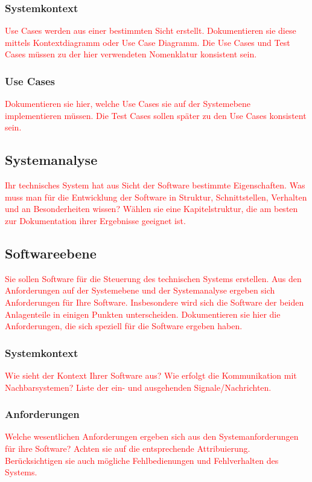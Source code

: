 \documentclass[a4paper, 11pt]{article}
\begin{document}
\subsubsection{Systemkontext}
\textcolor{red}{Use Cases werden aus einer bestimmten Sicht erstellt. Dokumentieren sie diese mittels Kontextdiagramm oder Use Case Diagramm. Die Use Cases und Test Cases müssen zu der hier verwendeten Nomenklatur konsistent sein.}

\subsubsection{Use Cases}
\textcolor{red}{Dokumentieren sie hier, welche Use Cases sie auf der Systemebene implementieren müssen. Die Test Cases sollen später zu den Use Cases konsistent sein.}

\subsection{Systemanalyse}
\textcolor{red}{Ihr technisches System hat aus Sicht der Software bestimmte Eigenschaften. Was muss man für die Entwicklung der Software in Struktur, Schnittstellen, Verhalten und an Besonderheiten wissen? Wählen sie eine Kapitelstruktur, die am besten zur Dokumentation ihrer Ergebnisse geeignet ist.}

\subsection{Softwareebene}
\textcolor{red}{Sie sollen Software für die Steuerung des technischen Systems erstellen. Aus den Anforderungen auf der Systemebene und der Systemanalyse ergeben sich Anforderungen für Ihre Software. Insbesondere wird sich die Software der beiden Anlagenteile in einigen Punkten unterscheiden. Dokumentieren sie hier die Anforderungen, die sich speziell für die Software ergeben haben.}

\subsubsection{Systemkontext}
\textcolor{red}{Wie sieht der Kontext Ihrer Software aus? Wie erfolgt die Kommunikation mit Nachbarsystemen? Liste der ein- und ausgehenden Signale/Nachrichten.}

\subsubsection{Anforderungen}
\textcolor{red}{Welche wesentlichen Anforderungen ergeben sich aus den Systemanforderungen für ihre Software? Achten sie auf die entsprechende Attribuierung. Berücksichtigen sie auch mögliche Fehlbedienungen und Fehlverhalten des Systems.}
\end{document}
